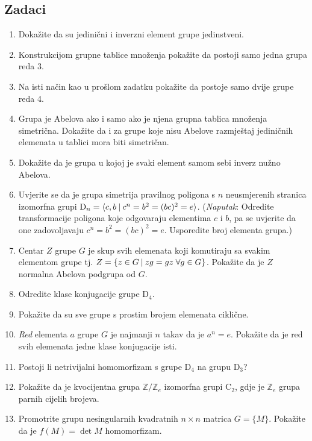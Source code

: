 \subsection*{Zadaci}

\begin{enumerate}[label=\arabic{chapter}.\arabic*.]
\item Dokažite da su jedinični i inverzni element grupe jedinstveni.
\item Konstrukcijom grupne tablice množenja pokažite da postoji samo
jedna grupa reda 3.
\item Na isti način kao u prošlom zadatku pokažite da postoje samo
dvije grupe reda 4.
\item Grupa je Abelova ako i samo ako je njena grupna tablica množenja simetrična.
Dokažite da i za grupe koje nisu Abelove razmještaj jediničnih elemenata u tablici
mora biti simetričan.
\item Dokažite da je grupa u kojoj je svaki element samom sebi inverz nužno Abelova.
\item Uvjerite se da je grupa simetrija pravilnog poligona s $n$ neusmjerenih
    stranica izomorfna grupi $\mathrm{D}_n=\langle c,b \: | \: c^n = b^2 = (bc)^2 = e \rangle $.
    (\emph{Naputak}: Odredite transformacije poligona koje odgovaraju elementima $c$ i
 $b$, pa se uvjerite da one zadovoljavaju $c^n = b^2 = (bc)^2 = e$. Usporedite
broj elementa grupa.)\label{zad:Dn}
\item Centar $Z$ grupe $G$ je skup svih elemenata koji komutiraju sa svakim
elementom grupe tj. $Z=\{z\in G \: | \: zg=gz \; \forall g\in G\}$. Pokažite da
je $Z$ normalna Abelova podgrupa od $G$.
\item Odredite klase konjugacije grupe D$_4$.
\item Pokažite da su sve grupe s prostim brojem elemenata ciklične.
\item \emph{Red} elementa $a$ grupe $G$ je najmanji $n$ takav da je $a^n=e$.
    Pokažite da je red svih elemenata jedne klase konjugacije isti.\label{zad:redel}
\item Postoji li netrivijalni homomorfizam s grupe D$_4$ na grupu D$_3$?
\item Pokažite da je kvocijentna grupa $\mathbb{Z}/\mathbb{Z}_e$
izomorfna grupi C$_2$, gdje je $\mathbb{Z}_e$ grupa parnih cijelih brojeva.
\item Promotrite grupu nesingularnih kvadratnih $n\times n$ 
matrica $G=\{M\}$. Pokažite da je $f(M)=\det M$ homomorfizam.
\end{enumerate}
